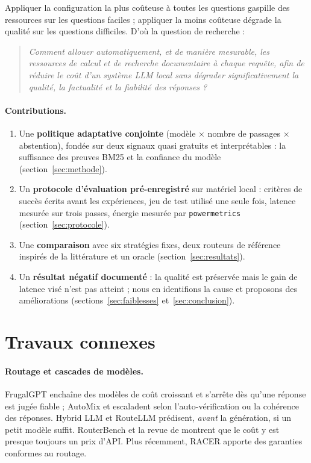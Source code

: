 \documentclass[11pt,a4paper]{article}
\begin{document}
Appliquer la configuration la plus coûteuse à toutes les questions gaspille des ressources sur les
questions faciles ; appliquer la moins coûteuse dégrade la qualité sur les questions difficiles. D'où la
question de recherche :

\begin{quote}
\emph{Comment allouer automatiquement, et de manière mesurable, les ressources de calcul et de recherche
documentaire à chaque requête, afin de réduire le coût d'un système LLM local sans dégrader
significativement la qualité, la factualité et la fiabilité des réponses ?}
\end{quote}

\paragraph{Contributions.}
\begin{enumerate}
\item Une \textbf{politique adaptative conjointe} (modèle $\times$ nombre de passages $\times$ abstention),
fondée sur deux signaux quasi gratuits et interprétables : la suffisance des preuves BM25 et la
confiance du modèle (section~\ref{sec:methode}).
\item Un \textbf{protocole d'évaluation pré-enregistré} sur matériel local : critères de succès écrits
avant les expériences, jeu de test utilisé une seule fois, latence mesurée sur trois passes, énergie
mesurée par \texttt{powermetrics} (section~\ref{sec:protocole}).
\item Une \textbf{comparaison} avec six stratégies fixes, deux routeurs de référence inspirés de la
littérature et un oracle (section~\ref{sec:resultats}).
\item Un \textbf{résultat négatif documenté} : la qualité est préservée mais le gain de latence visé
n'est pas atteint ; nous en identifions la cause et proposons des améliorations
(sections~\ref{sec:faiblesses} et~\ref{sec:conclusion}).
\end{enumerate}

\section{Travaux connexes}

\paragraph{Routage et cascades de modèles.} FrugalGPT \citep{chen2023frugalgpt} enchaîne des modèles de
coût croissant et s'arrête dès qu'une réponse est jugée fiable ; AutoMix \citep{aggarwal2023automix} et
\citet{yue2023cascades} escaladent selon l'auto-vérification ou la cohérence des réponses. Hybrid LLM
\citep{ding2024hybrid} et RouteLLM \citep{ong2024routellm} prédisent, \emph{avant} la génération, si un
petit modèle suffit. RouterBench \citep{hu2024routerbench} et la revue de \citet{varangot2025survey}
montrent que le coût y est presque toujours un prix d'API. Plus récemment, RACER \citep{hao2026racer}
apporte des garanties conformes au routage.
\end{document}
